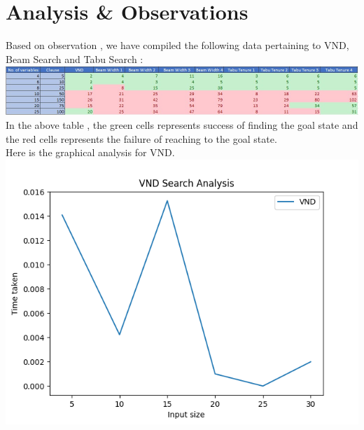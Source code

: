 \documentclass{article}
\begin{document}
\section{Analysis \& Observations}
\vspace{5pt}
Based on observation , we have compiled the following data pertaining to VND, Beam Search and Tabu Search :
\vspace*{10pt}
\\\includegraphics[scale=0.7]{Table1.jpg}
\vspace*{10pt}
\\In the above table , the green cells represents success of finding the goal state and the red cells represents the failure of reaching to the goal state.
\vspace*{10pt}
\\Here is the graphical analysis for VND. 
\\\includegraphics{VND.png}
\newpage
\end{document}
